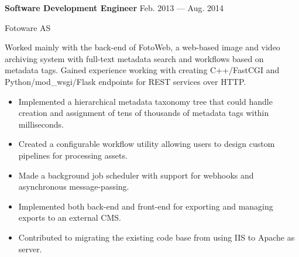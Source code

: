 \parbox[t][][t]{\linewidth}{
	\parbox{\linewidth}{{\textbf{Software Development Engineer}}
		\hfill {{Feb. 2013 --- Aug. 2014}}}
		\smallbreak
	\parbox{\linewidth}{Fotoware AS}

	\bigskip
	Worked mainly with the back-end of FotoWeb, a web-based image and video
	archiving system with full-text metadata search and workflows based on
	metadata tags. Gained experience working with creating C++/FastCGI and
	Python/mod\_wsgi/Flask endpoints for REST services over HTTP.

	\bigskip
	\begin{itemize}
		\item{Implemented a hierarchical metadata taxonomy tree that could handle creation
		and assignment of tens of thousands of metadata tags within
			milliseconds.}\\[-.6em]
		\item{Created a configurable workflow utility allowing users to
			design custom pipelines for processing assets.}\\[-.6em]
		\item{Made a background job scheduler with support for
			webhooks and asynchronous message-passing.}\\[-.6em]
		\item{Implemented both back-end and front-end for exporting and
			managing exports to an external CMS.}\\[-.6em]
		\item{Contributed to migrating the existing code base from
		using IIS to Apache as server.}
	\end{itemize}
}
